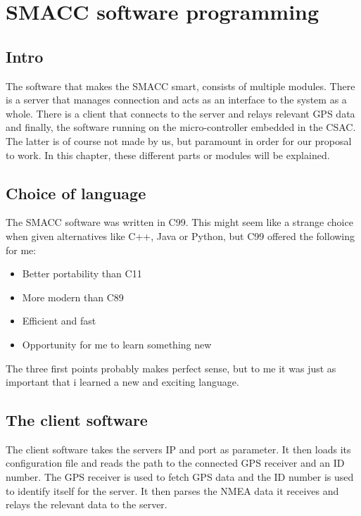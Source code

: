 \documentclass[12pt,english,a4paper]{report}
\begin{document}
\section{SMACC software programming}

\subsection{Intro}
The software that makes the SMACC smart, consists of multiple modules. There is a server that manages connection and acts as an interface to the system as a whole. There is a client that connects to the server and relays relevant GPS data and finally, the software running on the micro-controller embedded in the CSAC. The latter is of course not made by us, but paramount in order for our proposal to work. In this chapter, these different parts or modules will be explained.

\subsection{Choice of language}
The SMACC software was written in C99. This might seem like a strange choice when given alternatives like C++, Java or Python, but C99 offered the following for me:
\begin{itemize}
  \item Better portability than C11
  \item More modern than C89
  \item Efficient and fast
  \item Opportunity for me to learn something new
\end{itemize}
The three first points probably makes perfect sense, but to me it was just as important that i learned a new and exciting language. 

\subsection{The client software}
The client software takes the servers IP and port as parameter. It then loads its configuration file and reads the path to the connected GPS receiver and an ID number. The GPS receiver is used to fetch GPS data and the ID number is used to identify itself for the server. It then parses the NMEA data it receives and relays the relevant data to the server. 
\end{document}
